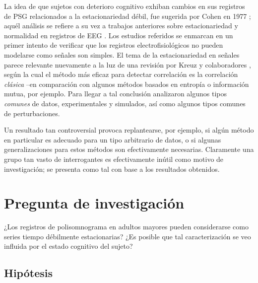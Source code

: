 La idea de que sujetos con deterioro cognitivo exhiban cambios en sus registros de PSG relacionados 
a la estacionariedad débil, fue sugerida por Cohen en 1977 \cite{Cohen77}; aquél análisis se 
refiere a su vez a trabajos anteriores sobre estacionariedad y normalidad en registros de EEG
\cite{McEwen75,Sugimoto78,Kawabata73}.
%
Los estudios referidos se enmarcan en un primer intento de verificar que los registros 
electrofisiológicos no pueden modelarse como señales son simples.
%
El tema de la estacionariedad en señales parece relevante nuevamente a la luz de una revisión
por Kreuz y colaboradores \cite{Kreuz07}, según la cual el método más eficaz para detectar 
correlación es la correlación \textit{clásica} --en comparación con algunos métodos basados en 
entropía o información mutua, por ejemplo. 
%
Para llegar a tal conclusión analizaron algunos tipos \textit{comunes} de datos, experimentales y 
simulados, así como algunos tipos comunes de perturbaciones.

Un resultado tan controversial provoca replantearse, por ejemplo, si algún método en particular es 
adecuado para un tipo arbitrario de datos, o si algunas generalizaciones para estos métodos son 
efectivamente necesarias.
%
Claramente una grupo tan vasto de interrogantes es efectivamente inútil como motivo de
investigación; se presenta como tal con base a los resultados obtenidos.


\section{Pregunta de investigación}

¿Los registros de polisomnograma en adultos mayores pueden considerarse como series tiempo 
débilmente estacionarias?
%
¿Es posible que tal caracterización se veo influida por el estado cognitivo del sujeto?


\subsection{Hipótesis}

